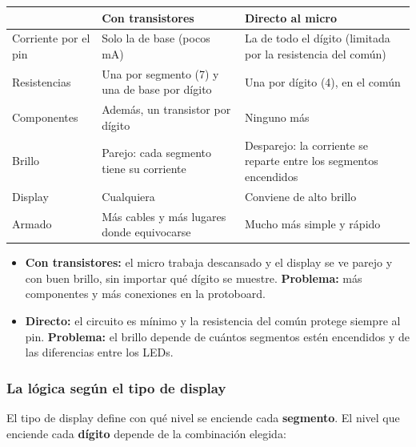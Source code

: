 \begin{table}[H]
\centering
\renewcommand{\arraystretch}{1.25}
\begin{tabularx}{\textwidth}{>{\raggedright\arraybackslash}p{2.6cm}
    >{\raggedright\arraybackslash}X >{\raggedright\arraybackslash}X}
\toprule
 & \textbf{Con transistores} & \textbf{Directo al micro} \\
\midrule
Corriente por el pin & Solo la de base (pocos mA) & La de todo el dígito (limitada por la resistencia del común) \\
Resistencias & Una por segmento (7) y una de base por dígito & Una por dígito (4), en el común \\
Componentes & Además, un transistor por dígito & Ninguno más \\
Brillo & Parejo: cada segmento tiene su corriente & Desparejo: la corriente se reparte entre los segmentos encendidos \\
Display & Cualquiera & Conviene de alto brillo \\
Armado & Más cables y más lugares donde equivocarse & Mucho más simple y rápido \\
\bottomrule
\end{tabularx}
\end{table}

\begin{itemize}
  \item \textbf{Con transistores:} el micro trabaja descansado y el display se ve parejo
        y con buen brillo, sin importar qué dígito se muestre. \textbf{Problema:} más
        componentes y más conexiones en la protoboard.
  \item \textbf{Directo:} el circuito es mínimo y la resistencia del común protege
        siempre al pin. \textbf{Problema:} el brillo depende de cuántos segmentos estén
        encendidos y de las diferencias entre los LEDs.
\end{itemize}

\subsubsection{La lógica según el tipo de display}

El tipo de display define con qué nivel se enciende cada \textbf{segmento}. El nivel que
enciende cada \textbf{dígito} depende de la combinación elegida:

